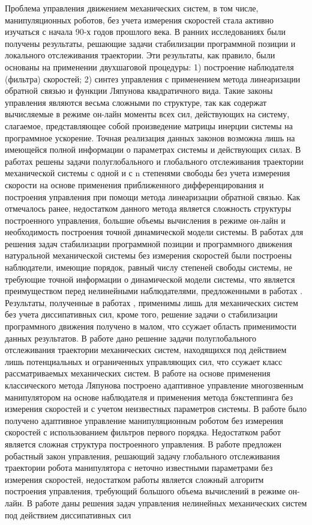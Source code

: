 {	Проблема управления движением механических систем, в том числе, манипуляционных роботов, без учета измерения скоростей стала активно изучаться с начала 90-х годов прошлого века. В ранних исследованиях \cite{nicosia, berghuis0, kelly, berghuis1, berghuis2} были получены результаты, решающие задачи стабилизации программной позиции и локального отслеживания траектории. Эти результаты, как правило, были основаны на применении двухшаговой процедуры: 1) построение наблюдателя (фильтра) скоростей; 2) синтез управления с применением метода линеаризации обратной связью и функции Ляпунова квадратичного вида. Такие законы управления являются весьма сложными по структуре, так как содержат вычисляемые в режиме он-лайн моменты всех сил, действующих на систему, слагаемое, представляющее собой произведение матрицы инерции системы на программное ускорение. Точная реализация данных законов возможна лишь на имеющейся полной информации о параметрах системы и действующих силах. В работах \cite{loria0, loria1} решены задачи полуглобального и глобального отслеживания траектории механической системы с одной и с n степенями свободы без учета измерения скорости на основе применения приближенного дифференцирования и построения управления при помощи метода линеаризации обратной связью. Как отмечалось ранее, недостатком данного метода является сложность структуры построенного управления, большие объемы вычисления в режиме он-лайн и необходимость построения точной динамической модели системы. В работах \cite{burkov0, burkov1} для решения задач стабилизации программной позиции и программного движения натуральной механической системы без измерения скоростей были построены наблюдатели, имеющие порядок, равный числу степеней свободы системы, не требующие точной информации о динамической модели системы, что является преимуществом перед нелинейными наблюдателями, предложенными в работах \cite{nicosia, berghuis0}. Результаты, полученные в работах \cite{burkov0, burkov1}, применимы лишь для механических систем без учета диссипативных сил, кроме того, решение задачи о стабилизации программного движения получено в малом, что ссужает область применимости данных результатов. В работе \cite{loria2} дано решение задачи полуглобального отслеживания траектории механических систем, находящихся под действием лишь потенциальных и ограниченных управляющих сил, что ссужает класс рассматриваемых механических систем. В работе \cite{calugi} на основе применения классического метода Ляпунова построено адаптивное управление многозвенным манипулятором на основе наблюдателя и применения метода бэкстеппинга без измерения скоростей и с учетом неизвестных параметров системы. В работе \cite{alonge} было получено адаптивное управление манипуляционным роботом без измерения скоростей с использованием фильтров первого порядка. Недостатком работ \cite{calugi, alonge} является сложная структура построенного управления. В работе \cite{dixon} предложен робастный закон управления, решающий задачу глобального отслеживания траектории робота манипулятора с неточно известными параметрами без измерения скоростей, недостатком работы является сложный алгоритм построения управления, требующий большого объема вычислений в режиме он-лайн. В работе \cite{nunes} даны решения задач управления нелинейных механических систем под действием диссипативных сил }
